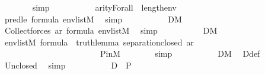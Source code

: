 \begin{isabellebody}
\ \ \ \ \ \ \isamarkupfalse%
\ simp\isanewline
\ \ \ \ \isamarkupfalse%
\isanewline
\ \ \ \ \isamarkupfalse%
\ {\isachardoublequoteopen}arity{\isacharparenleft}{\kern0pt}Forall{\isacharparenleft}{\kern0pt}{\isasymphi}{\isacharparenright}{\kern0pt}{\isacharparenright}{\kern0pt}\ {\isasymle}\ length{\isacharparenleft}{\kern0pt}env{\isacharparenright}{\kern0pt}{\isachardoublequoteclose}\ \isanewline
\ \ \ \ \ \ \isamarkupfalse%
\ pred{\isacharunderscore}{\kern0pt}le\ {\isacartoucheopen}{\isasymphi}{\isasymin}formula{\isacartoucheclose}\ {\isacartoucheopen}env{\isasymin}list{\isacharparenleft}{\kern0pt}M{\isacharparenright}{\kern0pt}{\isacartoucheclose}\ \isamarkupfalse%
\ simp\isanewline
\ \ \ \ \isamarkupfalse%
\isanewline
\ \ \ \ \isamarkupfalse%
\ {\isachardoublequoteopen}{\isacharquery}{\kern0pt}D{}{\isasymin}M{\isachardoublequoteclose}\ \isamarkupfalse%
\ Collect{\isacharunderscore}{\kern0pt}forces\ ar{\isasymphi}\ {\isacartoucheopen}{\isasymphi}{\isasymin}formula{\isacartoucheclose}\ {\isacartoucheopen}env{\isasymin}list{\isacharparenleft}{\kern0pt}M{\isacharparenright}{\kern0pt}{\isacartoucheclose}\ \isamarkupfalse%
\ simp\isanewline
\ \ \ \ \isamarkupfalse%
\isanewline
\ \ \ \ \isamarkupfalse%
\ {\isachardoublequoteopen}{\isacharquery}{\kern0pt}D{}{\isasymin}M{\isachardoublequoteclose}\ \isamarkupfalse%
\ {\isacartoucheopen}env{\isasymin}list{\isacharparenleft}{\kern0pt}M{\isacharparenright}{\kern0pt}{\isacartoucheclose}\ {\isacartoucheopen}{\isasymphi}{\isasymin}formula{\isacartoucheclose}\ \ truth{\isacharunderscore}{\kern0pt}lemma{\isacharprime}{\kern0pt}\ separation{\isacharunderscore}{\kern0pt}closed\ ar{\isasymphi}\isanewline
\ \ \ \ \ \ \ \ \ \ \ \ \ \ \ \ \ \ \ \ \ \ \ \ P{\isacharunderscore}{\kern0pt}in{\isacharunderscore}{\kern0pt}M\isanewline
\ \ \ \ \ \ \isamarkupfalse%
\ simp\isanewline
\ \ \ \ \isamarkupfalse%
\isanewline
\ \ \ \ \isamarkupfalse%
\ {\isachardoublequoteopen}D{\isasymin}M{\isachardoublequoteclose}\ \isamarkupfalse%
\ D{\isacharunderscore}{\kern0pt}def\ \isamarkupfalse%
\ Un{\isacharunderscore}{\kern0pt}closed\ \isamarkupfalse%
\ simp\isanewline
\ \ \ \ \isamarkupfalse%
\isanewline
\ \ \ \ \isamarkupfalse%
\ {\isachardoublequoteopen}D\ {\isasymsubseteq}\ P{\isachardoublequoteclose}\ \isamarkupfalse%

\end{isabellebody}
